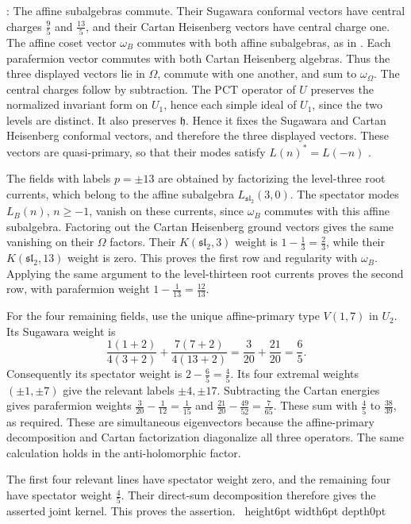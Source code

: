 \documentclass[leqno]{article}
\renewcommand{\geq}{\ensuremath{\geqslant}}
\newcommand{\qed}{\hfill \vrule height6pt  width6pt depth0pt}
\newenvironment{proof}[1][]{\noindent {\it Proof #1} : }{\hbox{~}\qed
\smallskip
}
\numberwithin{equation}{section}
\begin{document}
\begin{proof}
The affine subalgebras commute. Their Sugawara conformal vectors have central charges $\frac95$ and $\frac{13}{5}$, and their Cartan Heisenberg vectors have central charge one. The affine coset vector $\omega_B$ commutes with both affine subalgebras, as in \cite[Corollary 9.2 p.~26]{Arh26a}. Each parafermion vector commutes with both Cartan Heisenberg algebras. Thus the three displayed vectors lie in $\Omega$, commute with one another, and sum to $\omega_\Omega$. The central charges follow by subtraction. The PCT operator of $U$ preserves the normalized invariant form on $U_1$, hence each simple ideal of $U_1$, since the two levels are distinct. It also preserves $\mathfrak h$. Hence it fixes the Sugawara and Cartan Heisenberg conformal vectors, and therefore the three displayed vectors. These vectors are quasi-primary, so that their modes satisfy $L(n)^* = L(-n)$ \cite[Section 5]{CKLW18}.

The fields with labels $p = \pm13$ are obtained by factorizing the level-three root currents, which belong to the affine subalgebra $L_{\mathfrak{sl}_2}(3,0)$. The spectator modes $L_B(n)$, $n \geq -1$, vanish on these currents, since $\omega_B$ commutes with this affine subalgebra. Factoring out the Cartan Heisenberg ground vectors gives the same vanishing on their $\Omega$ factors. Their $K(\mathfrak{sl}_2,3)$ weight is $1-\frac13 = \frac23$, while their $K(\mathfrak{sl}_2,13)$ weight is zero. This proves the first row and regularity with $\omega_B$. Applying the same argument to the level-thirteen root currents proves the second row, with parafermion weight $1-\frac1{13} = \frac{12}{13}$.

For the four remaining fields, use the unique affine-primary type $V(1,7)$ in $U_2$. Its Sugawara weight is
\[
\frac{1(1+2)}{4(3+2)}+\frac{7(7+2)}{4(13+2)} = \frac3{20}+\frac{21}{20} = \frac65.
\]
Consequently its spectator weight is $2-\frac65 = \frac45$. Its four extremal weights $(\pm1,\pm7)$ give the relevant labels $\pm4,\pm17$. Subtracting the Cartan energies gives parafermion weights $\frac3{20}-\frac1{12} = \frac1{15}$ and $\frac{21}{20}-\frac{49}{52} = \frac7{65}$. These sum with $\frac45$ to $\frac{38}{39}$, as required. These are simultaneous eigenvectors because the affine-primary decomposition and Cartan factorization diagonalize all three operators. The same calculation holds in the anti-holomorphic factor.

The first four relevant lines have spectator weight zero, and the remaining four have spectator weight $\frac45$. Their direct-sum decomposition therefore gives the asserted joint kernel. This proves the assertion.
\end{proof}
\end{document}
